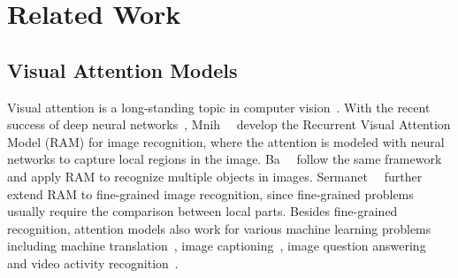 \documentclass[10pt,twocolumn,letterpaper]{article}
\begin{document}


\section{Related Work}

\subsection{Visual Attention Models}

Visual attention is a long-standing topic in computer vision~\cite{itti1998model, itti2001computational, tsotsos1995modeling}.
With the recent success of deep neural networks~\cite{krizhevsky2012imagenet, simonyan2014very, szegedy2015going, he2016deep}, Mnih~\etal~\cite{mnih2014recurrent} develop the Recurrent Visual Attention Model (RAM) for image recognition, where the attention is modeled with neural networks to capture local regions in the image.
Ba~\etal~\cite{ba2014multiple} follow the same framework and apply RAM to recognize multiple objects in images.
Sermanet~\etal~\cite{sermanet2014attention} further extend RAM to fine-grained image recognition, since fine-grained problems usually require the comparison between local parts.
Besides fine-grained recognition, attention models also work for various machine learning problems including machine translation~\cite{bahdanau2014neural}, image captioning~\cite{xu2015show}, image question answering~\cite{xu2016ask, chen2015abc, fukui2016multimodal, yang2016stacked} and video activity recognition~\cite{yeung2016end}.
\end{document}
